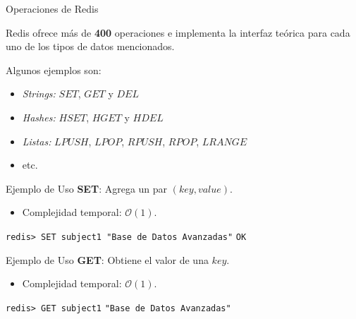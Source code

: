 \begin{frame}{Operaciones de Redis}
    
    Redis ofrece más de \textbf{400} operaciones e implementa la interfaz teórica para cada uno de los tipos de datos mencionados.
    
      

    Algunos ejemplos son:

      

    \begin{itemize}
        \item \textit{Strings:} $SET$, $GET$ y $DEL$
        
        \item \textit{Hashes:} $HSET$, $HGET$ y $HDEL$

        \item \textit{Listas:} $LPUSH$, $LPOP$, $RPUSH$, $RPOP$, $LRANGE$

        \item etc.
    \end{itemize}

\end{frame}

\begin{frame}{Ejemplo de Uso}
    \textbf{SET}: Agrega un par $(key, value)$.
    \begin{itemize}
        \item Complejidad temporal: $\mathcal{O}(1)$.
    \end{itemize}
    \vspace{0.6}
    \texttt{redis> SET subject1 "Base de Datos Avanzadas"} \newline
    \texttt{OK}   

\end{frame}
\begin{frame}{Ejemplo de Uso}
    \textbf{GET}: Obtiene el valor de una $key$.
    \begin{itemize}
        \item Complejidad temporal: $\mathcal{O}(1)$.
    \end{itemize}

    \texttt{redis> GET subject1}\newline
    \texttt{"Base de Datos Avanzadas"}

\end{frame}


